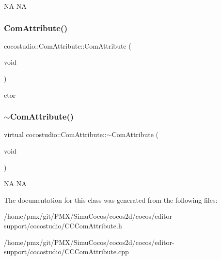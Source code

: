 NA  NA \mbox{\label{classcocostudio_1_1ComAttribute_adb9f109392486c4c6484ba806f47207f}} 
\subsubsection{\texorpdfstring{Com\+Attribute()}{ComAttribute()}\hspace{0.1cm}{\footnotesize\ttfamily [2/2]}}
{\footnotesize\ttfamily cocostudio\+::\+Com\+Attribute\+::\+Com\+Attribute (\begin{DoxyParamCaption}\item[{void}]{ }\end{DoxyParamCaption})}

ctor \mbox{\label{classcocostudio_1_1ComAttribute_a861e3cd9bffe1e828f427ca1f167fdfd}} 
\subsubsection{\texorpdfstring{$\sim$\+Com\+Attribute()}{~ComAttribute()}\hspace{0.1cm}{\footnotesize\ttfamily [2/2]}}
{\footnotesize\ttfamily virtual cocostudio\+::\+Com\+Attribute\+::$\sim$\+Com\+Attribute (\begin{DoxyParamCaption}\item[{void}]{ }\end{DoxyParamCaption})\hspace{0.3cm}{\ttfamily [virtual]}}

NA  NA 

The documentation for this class was generated from the following files\+:\begin{DoxyCompactItemize}
\item 
/home/pmx/git/\+P\+M\+X/\+Simu\+Cocos/cocos2d/cocos/editor-\/support/cocostudio/C\+C\+Com\+Attribute.\+h\item 
/home/pmx/git/\+P\+M\+X/\+Simu\+Cocos/cocos2d/cocos/editor-\/support/cocostudio/C\+C\+Com\+Attribute.\+cpp\end{DoxyCompactItemize}
